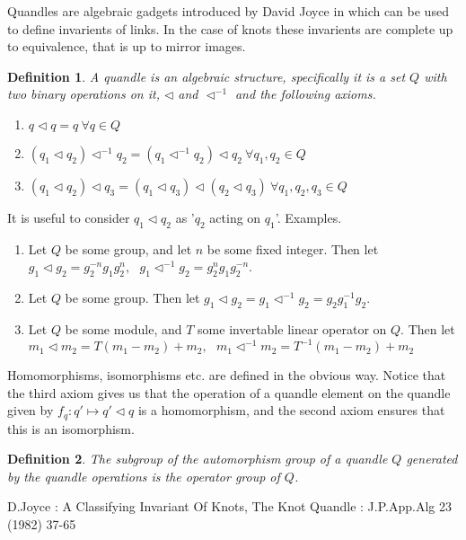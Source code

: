 \documentclass[12pt]{article}
\newtheorem{defn}{Definition}
\begin{document}
Quandles are algebraic gadgets introduced by David Joyce in \cite{Joyce} which can be used to define invarients of links. In the case of knots these invarients are complete up to equivalence, that is up to mirror images.
\begin{defn}
A \emph{quandle} is an algebraic structure, specifically it is a set $Q$ with two binary operations on it, $\lhd$ and $\lhd^{-1}$ and the following axioms.
\begin{enumerate}
  \item $q \lhd q = q \ \forall q \in Q$
  \item $(q_1 \lhd q_2) \lhd^{-1} q_2 = (q_1 \lhd^{-1} q_2)\lhd q_2 \ \forall q_1,q_2 \in Q$
  \item $(q_1 \lhd q_2) \lhd q_3 = (q_1 \lhd q_3) \lhd (q_2 \lhd q_3) \ \forall q_1,q_2,q_3 \in Q$
\end{enumerate}
\end{defn}
It is useful to consider $q_1 \lhd q_2$ as '$q_2$ acting on $q_1$'. \newline
Examples. \newline
\begin{enumerate}
  \item Let $Q$ be some group, and let $n$ be some fixed integer. 
Then let $g_1 \lhd g_2 = g_2^{-n}g_1g_2^n, \hspace{8pt} g_1 \lhd^{-1} g_2 = g_2^ng_1g_2^{-n}$.
  \item Let $Q$ be some group. Then let $g_1 \lhd g_2 = g_1 \lhd^{-1}g_2 = g_2g_1^{-1}g_2$.
  \item Let $Q$ be some module, and $T$ some invertable linear operator on $Q$. Then let 
      $m_1 \lhd m_2 = T(m_1 - m_2) +m_2, \hspace{8pt} m_1 \lhd^{-1} m_2 = T^{-1}(m_1 -m_2)+m_2$ 
\end{enumerate}
Homomorphisms, isomorphisms etc. are defined in the obvious way.
Notice that the third axiom gives us that the operation of a quandle element on the quandle given by
$f_q\colon q' \mapsto q' \lhd q$ is a homomorphism, and the second axiom ensures that this is an isomorphism. 
\begin{defn}
The subgroup of the automorphism group of a quandle $Q$ generated by the quandle operations is the \emph{operator group} of $Q$.  
\end{defn}

\begin{thebibliography}{99}
 D.Joyce : A Classifying Invariant Of Knots, The Knot 
Quandle : J.P.App.Alg 23 (1982) 37-65 
\end{thebibliography}

\end{document}
